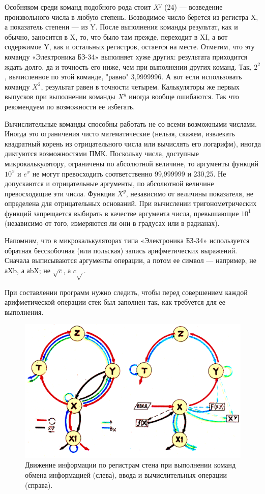 \documentclass[11pt,a4paper,oneside]{article}
\begin{document}
Особняком среди команд подобного рода стоит $X^{y}$ (24) — возведение произвольного числа в любую степень. Возводимое число берется из регистра X, а показатель степени — из Y. После выполнения команды результат, как и обычно, заносится в X, то, что было там прежде, переходит в XI, а вот содержимое Y, как и остальных регистров, остается на месте. Отметим, что эту команду «Электроника БЗ-34» выполняет хуже других: результата приходится ждать долго, да и точность его ниже, чем при выполнении других команд. Так, $2^{2}$, вычисленное по этой команде, "равно" 3,9999996. А вот если использовать команду $X^{2}$, результат равен в точности четырем. Калькуляторы же первых выпусков при выполнении команды $X^{y}$ иногда вообще ошибаются. Так что рекомендуем по возможности ее избегать.

Вычислительные команды способны работать не со всеми возможными числами. Иногда это ограничения чисто математические (нельзя, скажем, извлекать квадратный корень из отрицательного числа или вычислять его логарифм), иногда диктуются возможностями ПМК. Поскольку числа, доступные микрокалькулятору, ограничены по абсолютной величине, то аргументы функций $10^{x}$ и $e^{x}$ не могут превосходить соответственно 99,999999 и 230,25. Не допускаются и отрицательные аргументы, по абсолютной величине превосходящие эти числа. Функция $X^{y}$, независимо от величины показателя, не определена для отрицательных оснований. При вычислении тригонометрических функций запрещается выбирать в качестве аргумента числа, превышающие $10^{1}$ (независимо от того, измеряются ли они в градусах или в радианах).

Напомним, что в микрокалькуляторах типа «Электроника БЗ-34» используется обратная бесскобочная (или польская) запись арифметических выражений. Сначала выписываются аргументы операции, а потом ее символ — например, не аХb, а аbХ; не $\sqrt{c}$, а $c\sqrt{}$.

При составлении программ нужно следить, чтобы перед совершением каждой арифметической операции стек был заполнен так, как требуется для ее выполнения.

\begin{figure}[H]
\includegraphics[width=\textwidth]{stack}
\caption{Движение информации по регистрам стена при выполнении команд обмена информацией (слева), ввода и вычислительных операции (справа).}
\end{figure}
\end{document}

